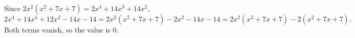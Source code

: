 Since $2x^2\left(x^2+7x+7\right)=2x^4+14x^3+14x^2$,
\[2x^4+14x^3+12x^2-14x-14=2x^2\left(x^2+7x+7\right)-2x^2-14x-14=2x^2\left(x^2+7x+7\right)-2\left(x^2+7x+7\right).\]
Both terms vanish, so the value is $\boxed{0}$.
